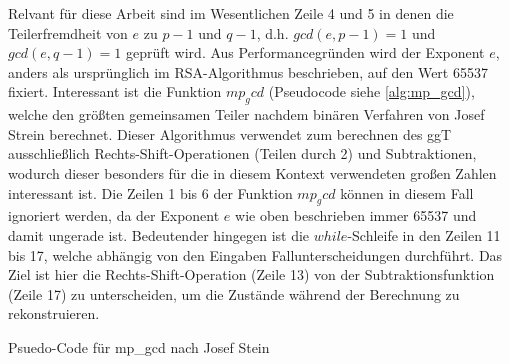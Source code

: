 Relvant für diese Arbeit sind im Wesentlichen Zeile 4 und 5 in denen die Teilerfremdheit von $e$ zu $p-1$ und $q-1$, d.h. $gcd(e,p-1) = 1$ und $gcd(e,q-1) = 1$ geprüft wird.
Aus Performancegründen wird der Exponent $e$, anders als ursprünglich im RSA-Algorithmus beschrieben, auf den Wert 65537 fixiert.
Interessant ist die Funktion $mp_gcd$ (Pseudocode siehe \ref{alg:mp_gcd}), welche den größten gemeinsamen Teiler nachdem binären Verfahren von Josef Strein \cite{} berechnet. Dieser Algorithmus verwendet zum berechnen des ggT ausschließlich Rechts-Shift-Operationen (Teilen durch 2) und Subtraktionen, wodurch dieser besonders für die in diesem Kontext verwendeten großen Zahlen interessant ist.
Die Zeilen 1 bis 6 der Funktion $mp_gcd$ können in diesem Fall ignoriert werden, da der Exponent $e$ wie oben beschrieben immer 65537 und damit ungerade ist. Bedeutender hingegen ist die $while$-Schleife in den Zeilen 11 bis 17, welche abhängig von den Eingaben Fallunterscheidungen durchführt. Das Ziel ist hier die Rechts-Shift-Operation (Zeile 13) von der Subtraktionsfunktion (Zeile 17) zu unterscheiden, um die Zustände während der Berechnung zu rekonstruieren.

\begin{algorithm}[h]
\DontPrintSemicolon
\caption{Psuedo-Code für mp_gcd nach Josef Stein}
\label{alg:mp_gcd}

\end{algorithm}

\newtextend


